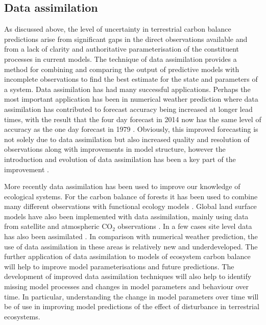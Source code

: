 \subsection{Data assimilation}


As discussed above, the level of uncertainty in terrestrial carbon balance predictions arise from significant gaps in the direct observations available and from a lack of clarity and authoritative parameterisation of the constituent processes in current models. The technique of data assimilation provides a method for combining and comparing the output of predictive models with incomplete observations to find the best estimate for the state and parameters of a system. Data assimilation has had many successful applications. Perhaps the most important application has been in numerical weather prediction where data assimilation has contributed to forecast accuracy being increased at longer lead times, with the result that the four day forecast in 2014 now has the same level of accuracy as the one day forecast in 1979 \citep{bauer2015quiet}. Obviously, this improved forecasting is not solely due to data assimilation but also increased quality and resolution of observations along with improvements in model structure, however the introduction and evolution of data assimilation has been a key part of the improvement \citep{dee2011era}.

More recently data assimilation has been used to improve our knowledge of ecological systems. For the carbon balance of forests it has been used to combine many different observations with functional ecology models \citep{zobitz2011primer, fox2009reflex, richardson2010estimating, Quaife2008, Zobitz2014, Niu2014}. Global land surface models have also been implemented with data assimilation, mainly using data from satellite and atmospheric $\text{CO}_{2}$ observations \citep{Kaminski2013, scholze2007propagating}. In a few cases site level data has also been assimilated \citep{Verbeeck2011, Bacour2015}. In comparison with numerical weather prediction, the use of data assimilation in these areas is relatively new and underdeveloped. The further application of data assimilation to models of ecosystem carbon balance will help to improve model parameterisations and future predictions. The development of improved data assimilation techniques will also help to  identify missing model processes and changes in model parameters and behaviour over time. In particular, understanding the change in model parameters over time will be of use in improving model predictions of the effect of disturbance in terrestrial ecosystems.
  

